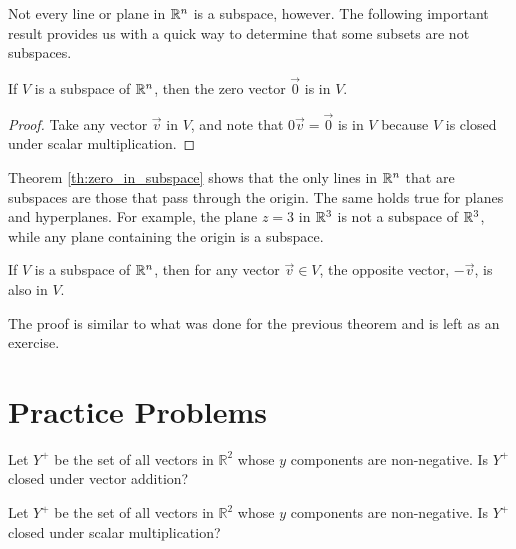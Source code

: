 \documentclass{ximera}
\begin{document}
Not every line or plane in $\mathbb{R}^n$ is a subspace, however.  The following important result provides us with a quick way to determine that some subsets are not subspaces.

\begin{theorem} \label{th:zero_in_subspace}
If $V$ is a subspace of $\mathbb{R}^n$, then the zero vector $\vec{0}$ is in $V$.
\end{theorem}
\begin{proof} 
Take any vector $\vec{v}$ in $V$, and note that $0 \vec{v} = \vec{0}$ is in $V$ because $V$ is closed under scalar multiplication.
\end{proof}

Theorem \ref{th:zero_in_subspace} shows that the only lines in $\mathbb{R}^n$ that are subspaces are those that pass through the origin.  The same holds true for planes and hyperplanes.  For example, the plane $z=3$ in $\mathbb{R}^3$ is not a subspace of $\mathbb{R}^3$, while any plane containing the origin is a subspace.

\begin{theorem} \label{th:opposite_in_subspace}
If $V$ is a subspace of $\mathbb{R}^n$, then for any vector $\vec{v} \in V$, the opposite vector, $-\vec{v}$, is also in $V$.
\end{theorem}

The proof is similar to what was done for the previous theorem and is left as an exercise.

\section*{Practice Problems}

 \begin{problem}\label{prob:Y^+1} Let $Y^+$ be the set of all vectors in $\mathbb{R}^2$ whose $y$ components are non-negative.  
 Is $Y^+$ closed under vector addition?
 
 \begin{multipleChoice}
 \end{multipleChoice}
 \end{problem}
 
 \begin{problem}\label{prob:Y^+2} Let $Y^+$ be the set of all vectors in $\mathbb{R}^2$ whose $y$ components are non-negative.  
 Is $Y^+$ closed under scalar multiplication?
 
  \begin{multipleChoice}
 \end{multipleChoice}
    \end{problem}
\end{document}
